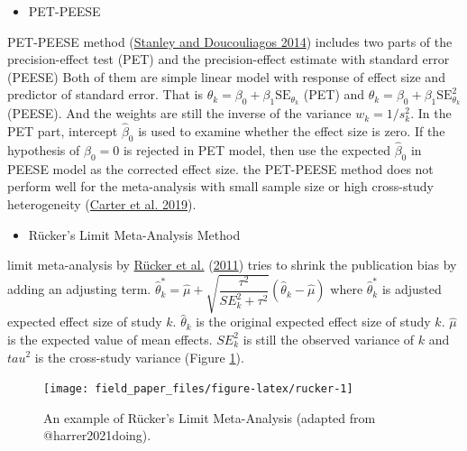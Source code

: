 \documentclass[
  11pt,
  openany]{memoir}
\providecommand{\tightlist}{%
  \setlength{\itemsep}{0pt}\setlength{\parskip}{0pt}}
\begin{document}
\begin{itemize}
\tightlist
\item
  PET-PEESE
\end{itemize}

PET-PEESE method (\protect\hyperlink{ref-stanleyMetaregressionApproximationsReduce2014}{Stanley and Doucouliagos 2014}) includes two parts of the precision-effect test (PET) and the precision-effect estimate with standard error (PEESE) Both of them are simple linear model with response of effect size and predictor of standard error. That is
\(\theta_k = \beta_0 + \beta_1\mathrm{SE}_{\theta_k}\) (PET) and \(\theta_k = \beta_0 + \beta_1\mathrm{SE}_{\theta_k}^2\) (PEESE).
And the weights are still the inverse of the variance \(w_k= 1/s_k^2\).
In the PET part, intercept \(\hat\beta_0\) is used to examine whether the effect size is zero.
If the hypothesis of \(\beta_0=0\) is rejected in PET model, then use the expected \(\hat\beta_0\) in PEESE model as the corrected effect size.
the PET-PEESE method does not perform well for the meta-analysis with small sample size or high cross-study heterogeneity (\protect\hyperlink{ref-carterCorrectingBiasPsychology2019}{Carter et al. 2019}).

\begin{itemize}
\tightlist
\item
  Rücker's Limit Meta-Analysis Method
\end{itemize}

limit meta-analysis by \protect\hyperlink{ref-ruckerTreatmenteffectEstimatesAdjusted2011}{Rücker et al.} (\protect\hyperlink{ref-ruckerTreatmenteffectEstimatesAdjusted2011}{2011}) tries to shrink the publication bias by adding an adjusting term.
\(\hat\theta^*_k = \hat\mu + \sqrt{\dfrac{\tau^2}{SE^2_k + \tau^2}}(\hat\theta_k - \hat\mu)\)
where \(\hat\theta^*_k\) is adjusted expected effect size of study \(k\).
\(\hat\theta_k\) is the original expected effect size of study \(k\).
\(\hat\mu\) is the expected value of mean effects.
\(SE^2_k\) is still the observed variance of \(k\) and \(tau^2\) is the cross-study variance (Figure \ref{fig:rucker}).

\begin{figure}

{\centering \texttt{[image: field\_paper\_files/figure-latex/rucker-1]} 

}

\caption{An example of Rücker's Limit Meta-Analysis (adapted from @harrer2021doing).}\label{fig:rucker}
\end{figure}
\end{document}
